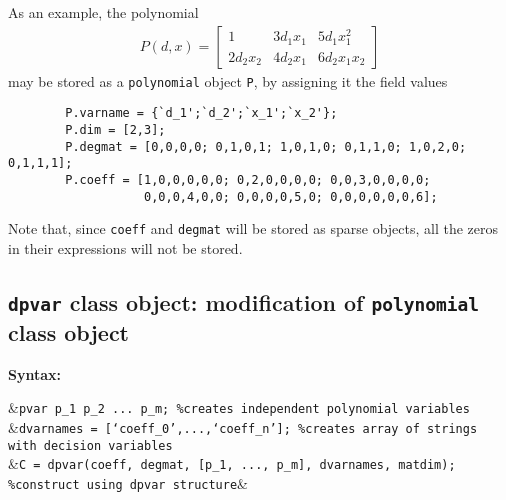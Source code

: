 \documentclass{article}
\newcommand{\bmat}[1]{\begin{bmatrix} #1\end{bmatrix}}
\begin{document}
	As an example, the polynomial
	\begin{align*}
	 P(d,x)=\bmat{1&3d_1x_1&5d_1x_1^2\\ 2d_2x_2&4d_2x_1&6d_2x_1x_2}
	\end{align*}
	may be stored as a \texttt{polynomial} object \texttt{P}, by assigning it the field values
	\begin{verbatim}
		P.varname = {`d_1';`d_2';`x_1';`x_2'};
		P.dim = [2,3];
		P.degmat = [0,0,0,0; 0,1,0,1; 1,0,1,0; 0,1,1,0; 1,0,2,0; 0,1,1,1];
		P.coeff = [1,0,0,0,0,0; 0,2,0,0,0,0; 0,0,3,0,0,0,0;
		           0,0,0,4,0,0; 0,0,0,0,5,0; 0,0,0,0,0,0,6];
	\end{verbatim}
	Note that, since \texttt{coeff} and \texttt{degmat} will be stored as sparse objects, all the zeros in their expressions will not be stored. 
	
	
	\subsection{\texttt{dpvar} class object: modification of \texttt{polynomial} class object}\label{subsec:dpvar-classdef}
	\textbf{Syntax:}
		\begin{flalign*}
			&\texttt{pvar p\_1 p\_2 ... p\_m; \%creates independent polynomial variables}\\
			&\texttt{dvarnames = [`coeff\_0',...,`coeff\_n']; \%creates array of strings with decision variables}\\
			&\texttt{C = dpvar(coeff, degmat, [p\_1, ..., p\_m], dvarnames, matdim); \%construct using dpvar structure}&
		\end{flalign*}
\end{document}
